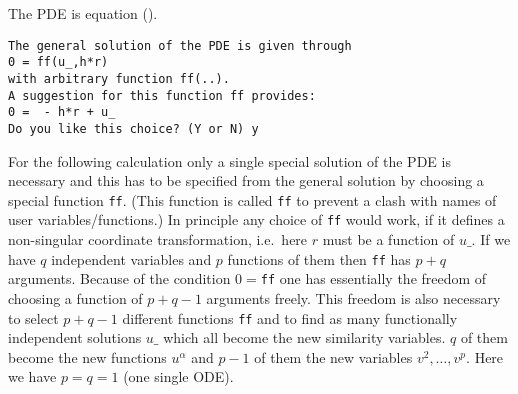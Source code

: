The PDE is equation ().
\begin{small}
\begin{verbatim}
The general solution of the PDE is given through
0 = ff(u_,h*r)
with arbitrary function ff(..).
A suggestion for this function ff provides:
0 =  - h*r + u_
Do you like this choice? (Y or N) y
\end{verbatim}
\end{small}
For the following calculation only a single special solution of the PDE is
necessary
and this has to be specified from the general solution by choosing a special
function \texttt{ff}. (This function is called \texttt{ff} to prevent a clash with
names of user variables/functions.) In principle any choice of \texttt{ff} would
work, if it defines a non-singular coordinate transformation, i.e.\ here $r$
must be a function of $u\_$. If we have $q$ independent variables and
$p$ functions of them then \texttt{ff} has $p+q$ arguments. Because of the
condition $0 = $\texttt{ff} one has essentially the freedom of choosing a function
of $p+q-1$ arguments freely. This freedom is also necessary to select $p+q-1$
different functions \texttt{ff} and to find as many functionally independent
solutions $u\_$ which all become the new similarity variables. $q$ of them
become the new functions $u^\alpha$ and $p-1$ of them the new variables
$v^2,\ldots,v^p$. Here we have $p=q=1$ (one single ODE).

